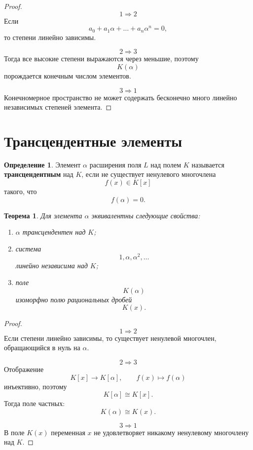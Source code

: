 \documentclass[12pt, a4paper]{article}
\newtheorem{theorem}{Теорема}
\theoremstyle{definition}
\newtheorem{definition}{Определение}
\theoremstyle{remark}
\begin{document}
\begin{proof}
	\[
	1\Rightarrow2
	\]
	Если
	\[
	a_0+a_1\alpha+\dots+a_n\alpha^n=0,
	\]
	то степени линейно зависимы.
	
	\[
	2\Rightarrow3
	\]
	Тогда все высокие степени выражаются через меньшие, поэтому
	\[
	K(\alpha)
	\]
	порождается конечным числом элементов.
	
	\[
	3\Rightarrow1
	\]
	Конечномерное пространство не может содержать бесконечно много линейно независимых степеней элемента.
\end{proof}

\section{Трансцендентные элементы}

\begin{definition}
	Элемент $\alpha$ расширения поля $L$ над полем $K$ называется
	\textbf{трансцендентным} над $K$, если не существует ненулевого многочлена
	\[
	f(x)\in K[x]
	\]
	такого, что
	\[
	f(\alpha)=0.
	\]
\end{definition}

\begin{theorem}
	Для элемента $\alpha$ эквивалентны следующие свойства:
	\begin{enumerate}
		\item $\alpha$ трансцендентен над $K$;
		\item система
		\[
		1,\alpha,\alpha^2,\dots
		\]
		линейно независима над $K$;
		\item поле
		\[
		K(\alpha)
		\]
		изоморфно полю рациональных дробей
		\[
		K(x).
		\]
	\end{enumerate}
\end{theorem}

\begin{proof}
	\[
	1\Rightarrow2
	\]
	Если степени линейно зависимы, то существует ненулевой многочлен,
	обращающийся в нуль на $\alpha$.
	
	\[
	2\Rightarrow3
	\]
	Отображение
	\[
	K[x]\to K[\alpha],
	\qquad
	f(x)\mapsto f(\alpha)
	\]
	инъективно, поэтому
	\[
	K[\alpha]\cong K[x].
	\]
	Тогда поле частных:
	\[
	K(\alpha)\cong K(x).
	\]
	
	\[
	3\Rightarrow1
	\]
	В поле $K(x)$ переменная $x$ не удовлетворяет никакому ненулевому
	многочлену над $K$.
\end{proof}

\end{document}
